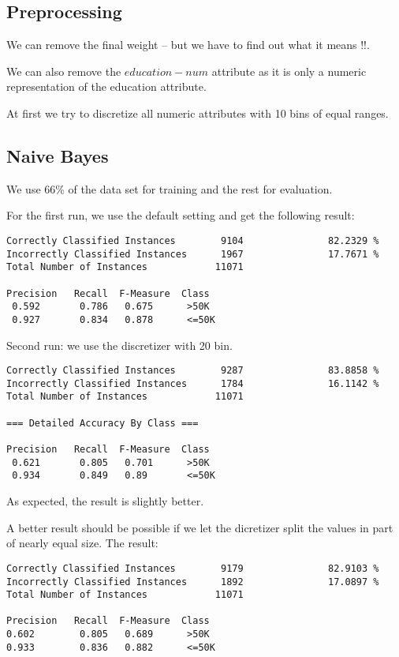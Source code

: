 \documentclass[paper=a4, fontsize=11pt]{scrartcl} %
\numberwithin{equation}{section} %
\numberwithin{figure}{section} %
\numberwithin{table}{section} %
\begin{document}
\subsection{Preprocessing}

We can remove the final weight -- but we have to find out what it means !!.

We can also remove the $education-num$ attribute as it is only a numeric representation of the education attribute.

At first we try to discretize all numeric attributes with 10 bins of equal ranges.

\subsection{Naive Bayes}

We use 66\% of the data set for training and the rest for evaluation.

For the first run, we use the default setting and get the following result:

\begin{verbatim}
Correctly Classified Instances        9104               82.2329 %
Incorrectly Classified Instances      1967               17.7671 %
Total Number of Instances            11071     

Precision   Recall  F-Measure  Class
 0.592       0.786   0.675      >50K
 0.927       0.834   0.878      <=50K
\end{verbatim}

Second run: we use the discretizer with 20 bin.

\begin{verbatim}
Correctly Classified Instances        9287               83.8858 %
Incorrectly Classified Instances      1784               16.1142 %
Total Number of Instances            11071     

=== Detailed Accuracy By Class ===

Precision   Recall  F-Measure  Class
 0.621       0.805   0.701      >50K
 0.934       0.849   0.89       <=50K
\end{verbatim}

As expected, the result is slightly better.

A better result should be possible if we let the dicretizer split the values in part of nearly equal size. The result:

\begin{verbatim}
Correctly Classified Instances        9179               82.9103 %
Incorrectly Classified Instances      1892               17.0897 %
Total Number of Instances            11071     

Precision   Recall  F-Measure  Class
0.602        0.805   0.689      >50K
0.933        0.836   0.882      <=50K
\end{verbatim}
\end{document}
